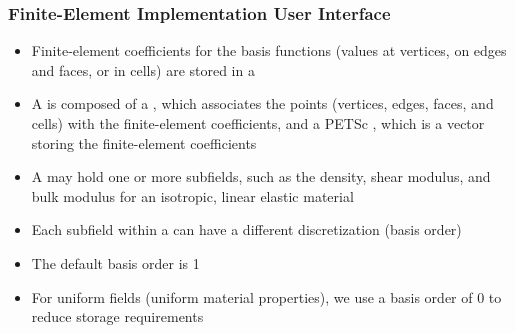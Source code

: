 \documentclass[aspectratio=169]{beamer}
\begin{document}
\begin{frame}
  \frametitle{Finite-Element Implementation User Interface}
  \summary{}

  \begin{itemize}
    \begin{itemize}
    \item Finite-element coefficients for the basis functions (values at vertices, on edges and faces, or in cells) are stored in a 
    \item A  is composed of a , which associates the points (vertices, edges, faces, and cells) with the finite-element coefficients, and a PETSc , which is a vector storing the finite-element coefficients
    \item A  may hold one or more subfields, such as the density, shear modulus, and bulk modulus for an isotropic, linear elastic material
    \end{itemize}
    \begin{itemize}
    \item Each subfield within a  can have a different discretization (basis order)
    \item The default basis order is 1
    \item For uniform fields (uniform material properties), we use a basis order of 0 to reduce storage requirements
    \end{itemize}
  \end{itemize}

\end{frame}
\end{document}
